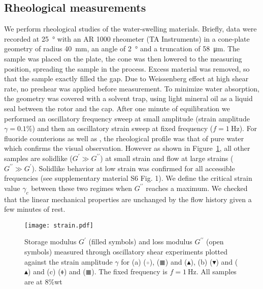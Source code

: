 \documentclass[journal=jacsat,manuscript=article]{achemso}
\begin{document}
\subsection{Rheological measurements}
We perform rheological studies of the water-swelling materials. Briefly, data were recorded at \SI{25}{\degree} with an AR 1000 rheometer (TA Instruments) in a cone-plate geometry of radius \SI{40}{\milli\metre}, an angle of \SI{2}{\degree} and a truncation of \SI{58}{\micro\metre}\cite{Macosko1994,Larson1999}. The sample was placed on the plate, the cone was then lowered to the measuring position, spreading the sample in the process. Excess material was removed, so that the sample exactly filled the gap. Due to Weissenberg effect at high shear rate, no preshear was applied before measurement. To minimize water absorption, the geometry was covered with a solvent trap, using light mineral oil as a liquid seal between the rotor and the cap. After one minute of equilibration we performed an oscillatory frequency sweep at small amplitude (strain amplitude $\gamma=0.1\%$) and then an oscillatory strain sweep at fixed frequency ($f=\SI{1}{\hertz}$). For fluoride counterions as well as , the rheological profile was that of pure water which confirms the visual observation. However as shown in Figure~\ref{fig:strain}, all other samples are solidlike ($G^\prime \gg G^{\prime\prime}$) at small strain and flow at large strains ($G^{\prime\prime} \gg G^\prime$). Solidlike behavior at low strain was confirmed for all accessible frequencies (see supplementary material S6 Fig. 1). We define the critical strain value $\gamma_c$ between these two regimes when $G^{\prime\prime}$ reaches a maximum. We checked that the linear mechanical properties are unchanged by the flow history given a few minutes of rest. %

\begin{figure}
\texttt{[image: strain.pdf]}
\caption{Storage modulus $G^\prime$ (filled symbols) and loss modulus $G^{\prime\prime}$ (open symbols) measured through oscillatory shear experiments plotted against the strain amplitude $\gamma$ for (a)  (\textcolor{lightgray}{$\bullet$}),  (\textcolor{gray}{$\blacksquare$}) and  ($\blacktriangle$), (b)  ($\blacktriangledown$) and  ($\blacktriangle$) and (c)  (\textcolor{gray}{$\blacklozenge$}) and  (\textcolor{gray}{$\blacksquare$}). The fixed frequency is $f=\SI{1}{\hertz}$. All samples are at 8\%wt }
\label{fig:strain}
\end{figure}
\end{document}
